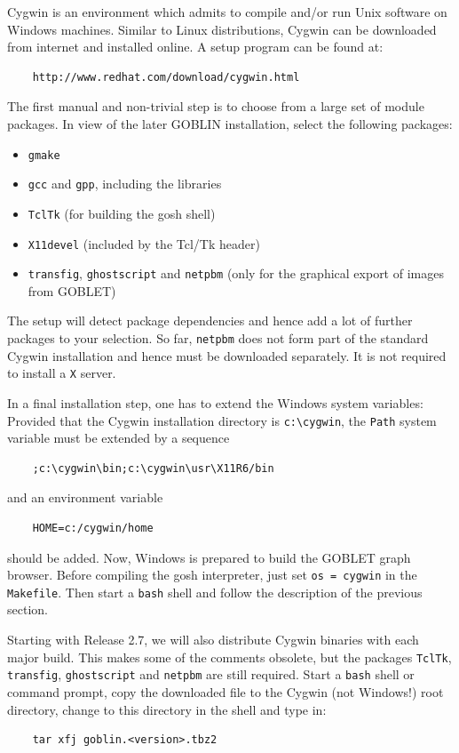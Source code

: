 \documentclass[a4paper,11pt,twoside]{book}
\begin{document}
\begin{multicols}{2}
Cygwin is an environment which admits to compile and/or run Unix software
on Windows machines. Similar to Linux distributions, Cygwin can be downloaded
from internet and installed online. A setup program can be found at:
\begin{verbatim}
    http://www.redhat.com/download/cygwin.html
\end{verbatim}
The first manual and non-trivial step is to choose from a large set of module
packages. In view of the later GOBLIN installation, select the following
packages:
\begin{itemize}
\item \verb/gmake/
\item \verb/gcc/ and \verb/gpp/, including the libraries
\item \verb/TclTk/ (for building the gosh shell)
\item \verb/X11devel/ (included by the Tcl/Tk header)
\item \verb/transfig/, \verb/ghostscript/ and \verb/netpbm/
      (only for the graphical export of images from GOBLET)
\end{itemize}
The setup will detect package dependencies and hence add a lot of further
packages to your selection. So far, \verb/netpbm/ does not form part of the
standard Cygwin installation and hence must be downloaded separately. It is
not required to install a \verb/X/ server.

In a final installation step, one has to extend the Windows system variables:
Provided that the Cygwin installation directory is \verb/c:\cygwin/, the
\verb/Path/ system variable must be extended by a sequence
\begin{verbatim}
    ;c:\cygwin\bin;c:\cygwin\usr\X11R6/bin
\end{verbatim}
and an environment variable
\begin{verbatim}
    HOME=c:/cygwin/home
\end{verbatim}
should be added. Now, Windows is prepared to build the GOBLET graph browser.
Before compiling the gosh interpreter, just set \verb/os = cygwin/ in the
\verb/Makefile/. Then start a \verb/bash/ shell and follow the description of
the previous section.

Starting with Release 2.7, we will also distribute Cygwin binaries with each
major build. This makes some of the comments obsolete, but the packages
\verb/TclTk/, \verb/transfig/, \verb/ghostscript/ and \verb/netpbm/ are still
required. Start a \verb/bash/ shell or command prompt, copy the downloaded file
to the Cygwin (not Windows!) root directory, change to this directory in the
shell and type in:
\begin{verbatim}
    tar xfj goblin.<version>.tbz2
\end{verbatim}



\end{multicols}
\end{document}
